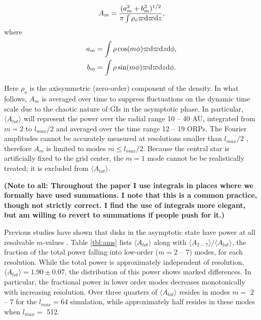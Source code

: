 \documentclass[manuscript]{aastex} %
\begin{document}
\begin{equation}
A_m = \frac{(a_m^2 + b_m^2)^{1/2}}{\pi\int\rho_o \varpi {\rm d}\varpi {\rm d}z},
\end{equation}
where
\begin{subequations}
\begin{align}
a_m &= \int \rho \cos(m\phi)\varpi {\rm d}\varpi {\rm d}z {\rm d}\phi,\\
b_m &=\int \rho \sin(m\phi)\varpi {\rm d}\varpi {\rm d}z {\rm d}\phi.
\end{align}
\end{subequations}


Here  $\rho_o$ is the axisymmetric (zero-order)  component of the density. In what follows, $A_m$ is averaged over time to suppress fluctuations on the dynamic time scale due to the chaotic nature of GIs in the asymptotic  phase.
In particular, $\langle A_{tot} \rangle$ will represent the power over the radial range 10 -- 40 AU, integrated from $ m = 2$ to $l_{max}/2$ and averaged over the time range 12 -- 19 ORPs. The Fourier amplitudes cannot be accurately measured at resolutions smaller than $l_{max}/2$ \citep{shannon1984}, therefore $A_m$ is limited to modes $m \le l_{max}/2$.  
Because the central star is artificially fixed to the grid center, the $m = 1$ mode cannot be be realistically treated; it is excluded from $\langle A_{tot} \rangle$.

{\bf (Note to all: Throughout the paper I use integrals in places where we 
formally have used summations.  I note that this is a common practice, though
not strictly correct.  I find the use of integrals more elegant, but am willing to
revert to summations if people push for it.)}

Previous studies have shown that disks in the asymptotic state have power at all resolvable $m$-values  \citep[e.g.][]{mejia2005,boley2006}.  Table \ref{tbl:ams} lists $\langle A_{tot} \rangle$ along with $\langle A_{2-7} \rangle  /  \langle A_{tot} \rangle$,  the fraction of the total power falling into low-order ($m = 2$ -- 7) modes, for each resolution. While the total power is approximately independent of resolution, $\langle A_{tot} \rangle = 1.90 \pm 0.07$, 
the distribution of this power shows marked differences. In particular, the fractional power in lower order modes decreases monotonically with increasing resolution.  Over three quarters of $\langle A_{tot} \rangle$ resides
in modes $m =$ 2 -- 7 for the $l_{max} = 64$ simulation, while approximately half resides in these modes when $l_{max} =$ 512.
\end{document}
